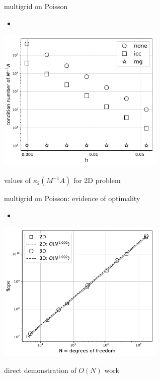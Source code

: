 \documentclass[hide notes,intlimits,usenames,dvipsnames]{beamer}
\begin{document}
\begin{frame}{multigrid on Poisson}
\begin{itemize}
\item \niceprobtwo
\end{itemize}

\begin{center}
\includegraphics[width=0.6\textwidth]{figs/pccondition}

\small values of $\kappa_2(M^{-1}A)$ for 2D problem
\end{center}
\end{frame}


\begin{frame}{multigrid on Poisson: evidence of optimality}
\begin{itemize}
\item \niceprob
\end{itemize}

\begin{center}
\includegraphics[width=0.6\textwidth]{figs/optimal-flops}

\small direct demonstration of $O(N)$ work
\end{center}
\end{frame}
\end{document}
